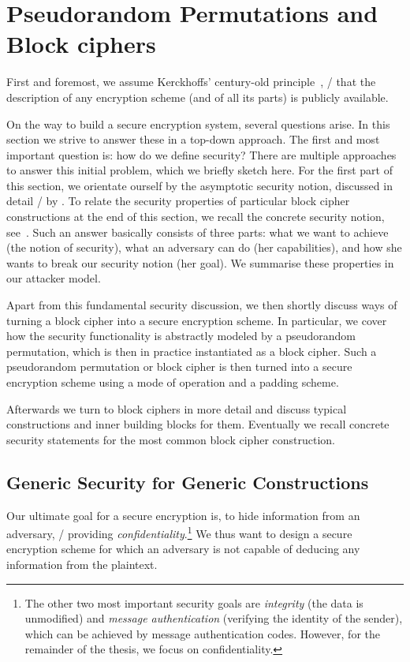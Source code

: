\section{Pseudorandom Permutations and Block ciphers}\label{sec:prelim:bc}

First and foremost, we assume Kerckhoffs' century-old principle~\cite[p.~12, 2nd condition]{kerckhoffs83}, \ie/ that the description of any encryption scheme (and of all its parts) is publicly available.

On the way to build a secure encryption system, several questions arise.
In this section we strive to answer these in a top-down approach.
The first and most important question is: how do we define security?
There are multiple approaches to answer this initial problem, which we briefly sketch here.
For the first part of this section, we orientate ourself by the asymptotic security notion, discussed in detail \eg/ by \textcite{katzlindell}.
To relate the security properties of particular block cipher constructions at the end of this section, we recall the concrete security notion, see~\cite{FOCS:BDJR97}.
Such an answer basically consists of three parts: what we want to achieve (the notion of security), what an adversary can do (her capabilities), and how she wants to break our security notion (her goal).
We summarise these properties in our attacker model.

Apart from this fundamental security discussion, we then shortly discuss ways of turning a block cipher into a secure encryption scheme.
In particular, we cover how the security functionality is abstractly modeled by a pseudorandom permutation, which is then in practice instantiated as a block cipher.
Such a pseudorandom permutation or block cipher is then turned into a secure encryption scheme using a mode of operation and a padding scheme.

Afterwards we turn to block ciphers in more detail and discuss typical constructions and inner building blocks for them.
Eventually we recall concrete security statements for the most common block cipher construction.

\subsection{Generic Security for Generic Constructions}
Our ultimate goal for a secure encryption is, to hide information from an adversary, \ie/ providing \emph{confidentiality}.\footnote{%
    The other two most important security goals are \emph{integrity} (the data is unmodified) and \emph{message authentication} (verifying the identity of the sender), which can be achieved by message authentication codes.
    However, for the remainder of the thesis, we focus on confidentiality.
}
We thus want to design a secure encryption scheme for which an adversary is not capable of deducing any information from the plaintext.

